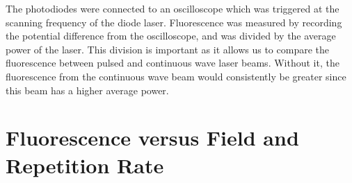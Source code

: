The photodiodes were connected to an oscilloscope which was triggered at the scanning frequency of the diode laser. Fluorescence was measured by recording the potential difference from the oscilloscope, and was divided by the average power of the laser. This division is important as it allows us to compare the fluorescence between pulsed and continuous wave laser beams. Without it, the fluorescence from the continuous wave beam would consistently be greater since this beam has a higher average power.

%
%



\section{Fluorescence versus Field and Repetition Rate}

